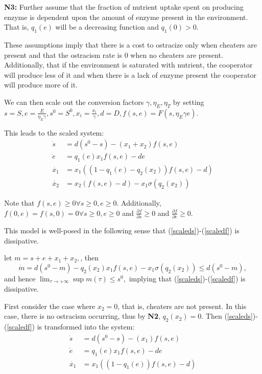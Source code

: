 \documentclass[12pt]{article}
\begin{document}
\noindent \textbf{N3: } Further assume that the fraction of nutrient uptake spent on producing enzyme is dependent upon the amount of enzyme present in the environment. That is, $q_1(e)$ will be a decreasing function and $q_1(0)>0$. 

These assumptions imply that there is a cost to ostracize only when cheaters are present and that the ostracism rate is 0 when no cheaters are present. Additionally, that if the environment is saturated with nutrient, the cooperator will produce less of it and when there is a lack of enzyme present the cooperator will produce more of it. 

\noindent We can then scale out the conversion factors $\gamma, \eta_E , \eta_T$ by setting $s=S, e=\frac{E}{\eta_E \gamma}, s^0=S^0, x_i=\frac{x_i}{\gamma}, d=D, f(s,e)=F(s,\eta_E \gamma e)$. 

This leads to the scaled system: 
\begin{align}
\dot{s}&=d(s^0-s)-(x_1 + x_2) f(s,e) \label{scaleds}\\
\dot{e}&=q_1(e) x_1 f(s,e)-de\\
\dot{x_1} &= x_1((1-q_1(e)-q_2(x_2))f(s,e)-d)\\
\dot{x_2}&=x_2(f(s,e)-d)-x_1 \sigma(q_2(x_2))\label{scaledf}
\end{align}

\noindent Note that $f(s,e) \geq 0 \forall s \geq 0, e \geq 0.$ Additionally, $f(0,e)=f(s,0)=0 \forall s\geq 0, e\geq 0$ and $\frac{\partial f}{\partial s} \geq 0$ and $\frac{\partial f}{\partial e} \geq 0$.  

\noindent This model is well-posed in the following sense that (\ref{scaleds})-(\ref{scaledf}) is dissipative.

\noindent let $m=s+e+x_1+x_2,$, then $$\dot{m}=d(s^0-m)-q_2(x_2 )x_1 f(s,e)- x_1 \sigma(q_2(x_2)) \leq d(s^0-m),$$ and hence $\lim_{\tau \rightarrow +\infty} \sup m(\tau) \leq s^0,$ implying that (\ref{scaleds})-(\ref{scaledf}) is dissipative.



\noindent First consider the case where $x_2=0$, that is, cheaters are not present. In this case, there is no ostracism occurring, thus by \textbf{N2}, $q_2(x_2) =0$. Then (\ref{scaleds})-(\ref{scaledf}) is transformed into the system: 
\begin{align}
\dot{s}&=d(s^0-s)-(x_1) f(s,e) \label{nox2s}\\
\dot{e}&=q_1(e) x_1 f(s,e)-de\\
\dot{x_1} &= x_1((1-q_1(e))f(s,e)-d)\label{nox2f}
\end{align}
\end{document}
